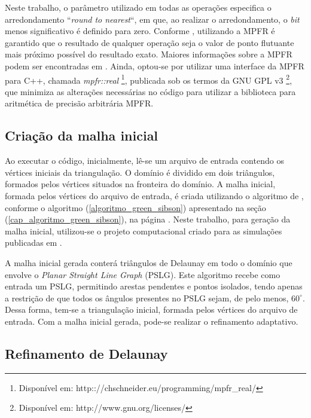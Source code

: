 Neste trabalho, o parâmetro utilizado em todas as operações especifica o arredondamento ``{\it round to nearest}``, em que, ao realizar o arredondamento, o {\it bit} menos significativo é definido para zero. Conforme , utilizando a MPFR é garantido que o resultado de qualquer operação seja o valor de ponto flutuante mais próximo possível do resultado exato. Maiores informações sobre a MPFR podem ser encontradas em . Ainda, optou-se por utilizar uma interface da MPFR para C++, chamada {\it mpfr::real} \footnote{Disponível em: http:://chschneider.eu/programming/mpfr\_real/}, publicada sob os termos da GNU GPL v3  \footnote{Disponível em: http://www.gnu.org/licenses/}, que minimiza as alterações necessárias no código para utilizar a biblioteca para aritmética de precisão arbitrária MPFR.

\subsection{Criação da malha inicial}
\label{cap_malha_inicial}

Ao executar o código, inicialmente, lê-se um arquivo de entrada contendo os vértices iniciais da triangulação. O domínio é dividido em dois triângulos, formados pelos vértices situados na fronteira do domínio. A malha inicial, formada pelos vértices do arquivo de entrada, é criada utilizando o algoritmo de , conforme o algoritmo (\ref{algoritmo_green_sibson}) apresentado na seção (\ref{cap_algoritmo_green_sibson}), na página \pageref{cap_algoritmo_green_sibson}. Neste trabalho, para geração da malha inicial, utilizou-se o projeto computacional criado para as simulações publicadas em .

A malha inicial gerada conterá triângulos de Delaunay em todo o domínio que envolve o \emph {Planar Straight Line Graph} (PSLG). Este algoritmo recebe como entrada um PSLG, permitindo arestas pendentes e pontos isolados, tendo apenas a restrição de que todos os ângulos presentes no PSLG sejam, de pelo menos, $60^{\circ}$. Dessa forma, tem-se a triangulação inicial, formada pelos vértices do arquivo de entrada. Com a malha inicial gerada, pode-se realizar o refinamento adaptativo.

\subsection{Refinamento de Delaunay}
\label{cap_refinamento_adaptativo}

